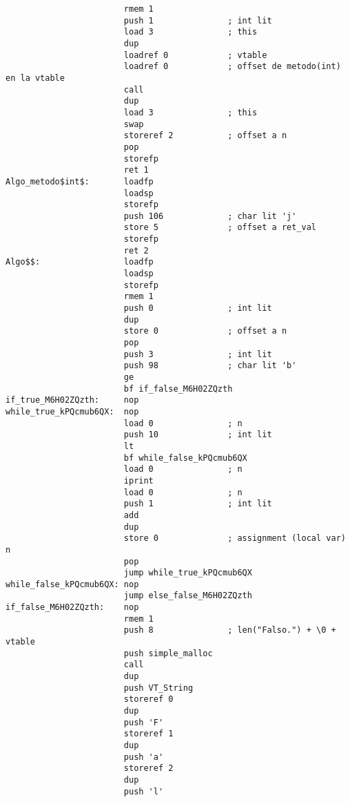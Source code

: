 \documentclass [a4paper,abstracton,titlepage]{scrartcl}
\begin{document}
\begin{lstlisting}
                        rmem 1
                        push 1               ; int lit
                        load 3               ; this
                        dup
                        loadref 0            ; vtable
                        loadref 0            ; offset de metodo(int) en la vtable
                        call
                        dup
                        load 3               ; this
                        swap
                        storeref 2           ; offset a n
                        pop
                        storefp
                        ret 1
Algo_metodo$int$:       loadfp
                        loadsp
                        storefp
                        push 106             ; char lit 'j'
                        store 5              ; offset a ret_val
                        storefp
                        ret 2
Algo$$:                 loadfp
                        loadsp
                        storefp
                        rmem 1
                        push 0               ; int lit
                        dup
                        store 0              ; offset a n
                        pop
                        push 3               ; int lit
                        push 98              ; char lit 'b'
                        ge
                        bf if_false_M6H02ZQzth
if_true_M6H02ZQzth:     nop
while_true_kPQcmub6QX:  nop
                        load 0               ; n
                        push 10              ; int lit
                        lt
                        bf while_false_kPQcmub6QX
                        load 0               ; n
                        iprint
                        load 0               ; n
                        push 1               ; int lit
                        add
                        dup
                        store 0              ; assignment (local var) n
                        pop
                        jump while_true_kPQcmub6QX
while_false_kPQcmub6QX: nop
                        jump else_false_M6H02ZQzth
if_false_M6H02ZQzth:    nop
                        rmem 1
                        push 8               ; len("Falso.") + \0 + vtable
                        push simple_malloc
                        call
                        dup
                        push VT_String
                        storeref 0
                        dup
                        push 'F'
                        storeref 1
                        dup
                        push 'a'
                        storeref 2
                        dup
                        push 'l'

\end{lstlisting}
\end{document}
